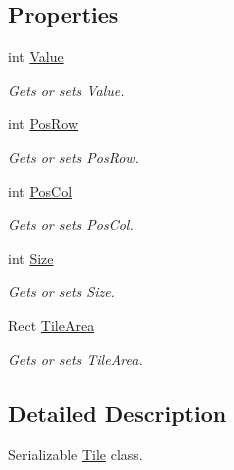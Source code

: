 \subsection*{Properties}
\begin{DoxyCompactItemize}
\item 
int \mbox{\hyperlink{class_game_1_1_tile_a946c80097e8794e44ecf54ca52584280}{Value}}
\begin{DoxyCompactList}\small\item\em Gets or sets Value. \end{DoxyCompactList}\item 
int \mbox{\hyperlink{class_game_1_1_tile_adb77ee78f3f25dcf4777d1b6531edd97}{Pos\+Row}}
\begin{DoxyCompactList}\small\item\em Gets or sets Pos\+Row. \end{DoxyCompactList}\item 
int \mbox{\hyperlink{class_game_1_1_tile_acb7194e379c2580b2809bc237d6bfa57}{Pos\+Col}}
\begin{DoxyCompactList}\small\item\em Gets or sets Pos\+Col. \end{DoxyCompactList}\item 
int \mbox{\hyperlink{class_game_1_1_tile_abc440773425014636b7460a55cc93983}{Size}}
\begin{DoxyCompactList}\small\item\em Gets or sets Size. \end{DoxyCompactList}\item 
Rect \mbox{\hyperlink{class_game_1_1_tile_ad17074956833912d06a9539a4b41d24e}{Tile\+Area}}
\begin{DoxyCompactList}\small\item\em Gets or sets Tile\+Area. \end{DoxyCompactList}\end{DoxyCompactItemize}


\subsection{Detailed Description}
Serializable \mbox{\hyperlink{class_game_1_1_tile}{Tile}} class. 



